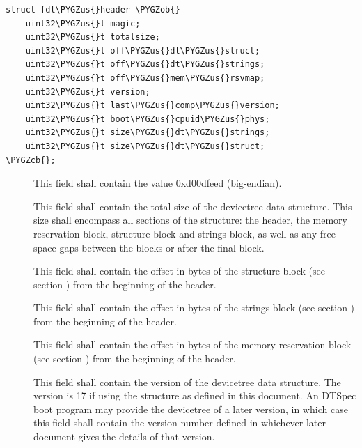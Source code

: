 \documentclass[a4paper,10pt,oneside]{sphinxmanual}
\def\PYGZus{\char`\_}
\def\PYGZob{\char`\{}
\def\PYGZcb{\char`\}}
\begin{document}
\begin{Verbatim}[commandchars=\\\{\}]
struct fdt\PYGZus{}header \PYGZob{}
    uint32\PYGZus{}t magic;
    uint32\PYGZus{}t totalsize;
    uint32\PYGZus{}t off\PYGZus{}dt\PYGZus{}struct;
    uint32\PYGZus{}t off\PYGZus{}dt\PYGZus{}strings;
    uint32\PYGZus{}t off\PYGZus{}mem\PYGZus{}rsvmap;
    uint32\PYGZus{}t version;
    uint32\PYGZus{}t last\PYGZus{}comp\PYGZus{}version;
    uint32\PYGZus{}t boot\PYGZus{}cpuid\PYGZus{}phys;
    uint32\PYGZus{}t size\PYGZus{}dt\PYGZus{}strings;
    uint32\PYGZus{}t size\PYGZus{}dt\PYGZus{}struct;
\PYGZcb{};
\end{Verbatim}
\begin{description}
\item[{}] \leavevmode
This field shall contain the value 0xd00dfeed (big-endian).

\item[{}] \leavevmode
This field shall contain the total size of the devicetree data
structure. This size shall encompass all sections of the structure:
the header, the memory reservation block, structure block and
strings block, as well as any free space gaps between the blocks or
after the final block.

\item[{}] \leavevmode
This field shall contain the offset in bytes of the structure block
(see section {\hyperref[flattened\string-format:sect\string-fdt\string-structure\string-block]{}}) from the beginning of the header.

\item[{}] \leavevmode
This field shall contain the offset in bytes of the strings block
(see section {\hyperref[flattened\string-format:sect\string-fdt\string-strings\string-block]{}}) from the beginning of the header.

\item[{}] \leavevmode
This field shall contain the offset in bytes of the memory
reservation block (see section {\hyperref[flattened\string-format:sect\string-fdt\string-memory\string-reservation\string-block]{}})
from the beginning of the header.

\item[{}] \leavevmode
This field shall contain the version of the devicetree data
structure. The version is 17 if using the structure as defined in
this document. An DTSpec boot program may provide the devicetree of
a later version, in which case this field shall contain the version
number defined in whichever later document gives the details of that
version.


\end{description}
\end{document}
